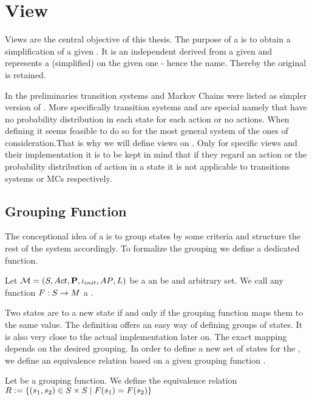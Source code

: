 \documentclass[preview]{standalone}
\begin{document}
\section{View}
Views are the central objective of this thesis. The purpose of a \viewN is to obtain a simplification of a given \chosengraphtypeN.  It is an independent \chosengraphtypeN derived from a given \chosengraphtypeN and represents a (simplified) \viewN on the given one - hence the name. Thereby the original \chosengraphtypeN is retained.

In the preliminaries transition systems and Markov Chains were listed as simpler version of \mdpsN. More specifically transition systems and \mdpsN are special \mdpsN namely that have no probability distribution in each state for each action or no actions. When defining \viewsN it seems feasible to do so for the most general system of the ones of consideration.That is why we will define views on \mdpsN. Only for specific views and their implementation it is to be kept in mind that if they regard an action or the probability distribution of action in a state it is not applicable to transitions systems or MCs respectively. 

\subsection{Grouping Function}
The conceptional idea of a \viewN is to group states by some criteria and structure the rest of the system accordingly. To formalize the grouping we define a dedicated function.

\begin{definition}
	Let ${{{\mathcal{M}}}} = {{({S}, {Act}, {\textbf{P}}, {\iota_{init}}, {AP}, {L})}}$ be a \chosengraphtypeN an \arbset be and arbitrary set. We call any function $F : {S} \to {\ensuremath{{M}}}$ a \emph{\grpfctN}.
	
	\label{def:grpfct}
\end{definition}


Two states are  to a new state if and only if the grouping function maps them to the same value. The definition offers an easy way of defining groups of states. It is also very close to the actual implementation later on. The exact mapping depends on the desired grouping. In order to define a new set of states for the \viewN, we define an equivalence relation \eqrelview based on a given grouping function \grpfct.

\begin{definition}
	Let \grpfct be a grouping function. We define the equivalence relation ${R} :=\{ ({s}_1, {s}_2) \in {S} \times {S} \mid {F}({s}_1) = {F}({s}_2)\}$
	
	\label{def:eqrelview}
\end{definition}
\end{document}
